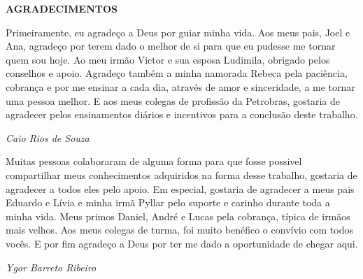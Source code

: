 \begin{center}
	\textbf{AGRADECIMENTOS}
\end{center}

Primeiramente, eu agradeço a Deus por guiar minha vida. Aos meus pais, Joel e Ana, agradeço por terem dado o melhor de si para que eu pudesse me tornar quem sou hoje. Ao meu irmão Victor e sua esposa Ludimila, obrigado pelos conselhos e apoio. Agradeço também a minha namorada Rebeca pela paciência, cobrança e por me ensinar a cada dia, através de amor e sinceridade, a me tornar uma pessoa melhor. E aos meus colegas de profissão da Petrobras, gostaria de agradecer pelos ensinamentos diários e incentivos para a conclusão deste trabalho.
\begin{flushright}
	\textit{Caio Rios de Souza}
\end{flushright}

Muitas pessoas colaboraram de alguma forma para que fosse possivel compartilhar meus conhecimentos adquiridos na forma desse trabalho, gostaria de agradecer a todos eles pelo apoio. Em especial, gostaria de agradecer a meus pais Eduardo e Lívia e minha irmã Pyllar pelo suporte e carinho durante toda a minha vida. Meus primos Daniel, André e Lucas pela cobrança, típica de irmãos mais velhos. Aos meus colegas de turma, foi muito benéfico o convívio com todos vocês. E por fim agradeço a Deus por ter me dado a oportunidade de chegar aqui.
\begin{flushright}
	\textit{Ygor Barreto Ribeiro}
\end{flushright}
